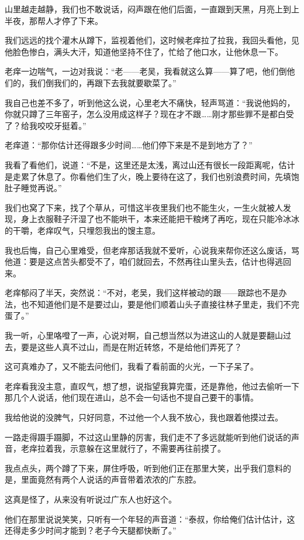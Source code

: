 山里越走越静，我们也不敢说话，闷声跟在他们后面，一直跟到天黑，月亮上到上半夜，那帮人才停了下来。

我们远远的找个灌木从蹲下，监视着他们，这时候老痒拉了拉我，我回头看他，见他脸色惨白，满头大汗，知道他坚持不住了，忙给了他口水，让他休息一下。

老痒一边喘气，一边对我说：“老——老吴，我看就这么算——算了吧，他们倒他们的，我们倒我们的，再跟下去我就要歇菜了。”

我自己也差不多了，听到他这么说，心里老大不痛快，轻声骂道：“我说他妈的，你就只蹲了三年窑子，怎么没用成这样子？现在才不跟……刚才那些罪不是都白受了？给我咬咬牙挺着。”

老痒道：“那你估计还得跟多少时间……他们停下来是不是到地方了？”

我看了看他们，说道：“不是，这里还是太浅，离过山还有很长一段距离呢，估计是走累了休息了。你看他们生了火，晚上要待在这了，我们也别浪费时间，先填饱肚子睡觉再说。”

我们也窝了下来，找了个草从，可惜这半夜里我们也不能生火，一生火就被人发现，身上衣服鞋子汗湿了也不能哄干，本来还能把干粮烤了再吃，现在只能冷冰冰的干嚼，老痒叹气，只埋怨我出的馊主意。

我也后悔，自己心里难受，但老痒那话我就不爱听，心说我来帮你还这么废话，骂他道：要是这点苦头都受不了，咱们就回去，不然再往山里头去，估计也得逃回来。

老痒郁闷了半天，突然说：“不对，老吴，我们这样被动的跟——跟踪也不是办法，也不知道他们是不是要过山，要是他们顺着山头子直接往林子里走，我们不完蛋了。”

我一听，心里咯噔了一声，心说对啊，自己想当然以为进这山的人就是要翻山过去，要是这些人真不过山，而是在附近转悠，不是给他们弄死了？

这可真难办了，又不能去问他们，我看了看前面的火光，一下子呆了。

老痒看我没主意，直叹气，想了想，说指望我算完蛋，还是靠他，他过去偷听一下那几个人说话，他们现在进山，总不会一句话也不提自己要干的事情。

我给他说的没脾气，只好同意，不过他一个人我不放心，我也跟着他摸过去。

一路走得蹑手蹑脚，不过这山里静的厉害，我们走不了多远就能听到他们说话的声音，老痒拉着我，示意躲在这里就行了，不需要再往前摸了。

我点点头，两个蹲了下来，屏住呼吸，听到他们正在那里大笑，出乎我们意料的是，里面竟然有两个人说话的声音带着浓浓的广东腔。

这真是怪了，从来没有听说过广东人也好这个。

他们在那里说说笑笑，只听有一个年轻的声音道：“泰叔，你给俺们估计估计，这还得走多少时间才能到？老子今天腿都快断了。”

